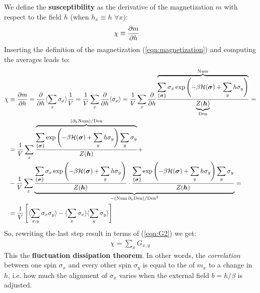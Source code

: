 \documentclass[../template.tex]{subfiles}
\begin{document}
We define the \textbf{susceptibility} as the derivative of the magnetization $m$ with respect to the field $h$ (when $h_x \equiv h$ $\forall x$):
\begin{align}\label{eqn:susceptibility}
    \chi &\equiv \pdv{m}{h}
\end{align}
Inserting the definition of the magnetization (\ref{eqn:magnetization}) and computing the averages leads to:
\vspace{-2em}
\begin{align*}
    \chi &\equiv \pdv{m}{h} = \pdv{h} \langle \sum_x \sigma_x \rangle \frac{1}{V} = \frac{1}{V} \sum_x \pdv{h} \langle \sigma_x \rangle  = \frac{1}{V} \sum_x \pdv{h}
    \frac{\displaystyle \overbrace{\sum_{\{\bm{\sigma}\}} \sigma_x \exp\left(- \beta \mathcal{H}(\bm{\sigma}) + \sum_y h \sigma_y \right)}^{\mathclap{\mathrm{Num}}} }{\underbrace{Z(\bm{h})}_{\mathrm{Den}} } = \\
    &= \frac{1}{V} \sum_x 
    \frac{\displaystyle \overbrace{\sum_{\{\bm{\sigma}\}} \exp\left(-\beta \mathcal{H}(\bm{\sigma}) + \sum_y h \sigma_y\right) \sum_y \sigma_y}^{(\partial_h \mathrm{Num}) / \mathrm{Den}  } }
         {Z(\bm{h})} +\\
    &-\frac{1}{V}\sum_x \underbrace{\frac{\displaystyle 
    \sum_{\{\bm{\sigma}\}} \sigma_x \exp\left(- \beta \mathcal{H}(\bm{\sigma}) + \sum_y h \sigma_y\right)}{Z(\bm{h})}\cdot \frac{\displaystyle \sum_{\{\bm{\sigma}\}} \exp\left(-\beta \mathcal{H}(\bm{\sigma}) + \sum_y h \sigma_y \right) \sum_y \sigma_y}{Z(\bm{h})} }_{-(\mathrm{Num} \,\partial_h \mathrm{Den}) / \mathrm{Den}^2 } =\\
    &= \frac{1}{V}\left[\langle \sum_{x,y} \sigma_x \sigma_y \rangle - \langle \sum_x \sigma_x \rangle \langle \sum_y \sigma_y \rangle\right] 
\end{align*}
So, rewriting the last step result in terms of (\ref{eqn:G2}) we get:
\begin{align*}
    \chi = \sum_x G_{x,y}
\end{align*}
This the \textbf{fluctuation dissipation theorem}. In other words, the  \textit{correlation} between one spin $\sigma_x$ and every other spin $\sigma_y$ is equal to the  of $m_x$ to a change in $h$, i.e. how much the alignment of $\sigma_x$ varies when the external field $b = h/\beta$ is adjusted.
 
\medskip
\end{document}
